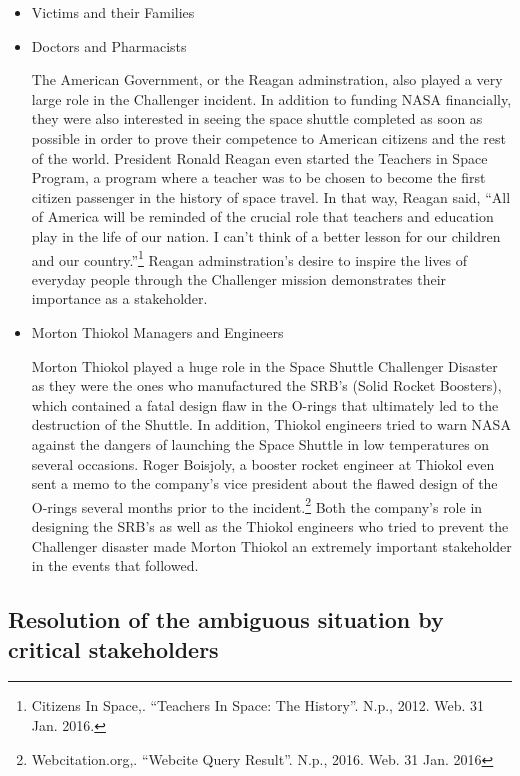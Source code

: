 \documentclass{article}
\newcommand{\q}[1]{``#1''}
\begin{document}
\begin{itemize}

\item
Victims and their Families

 \par

\item
Doctors and Pharmacists

The American Government, or the Reagan adminstration, also played a very large role in the Challenger incident. In addition to funding NASA financially, they were also interested in seeing the space shuttle completed as soon as possible in order to prove their competence to American citizens and the rest of the world. President Ronald Reagan even started the Teachers in Space Program, a program where a teacher was to be chosen to become the first citizen passenger in the history of space travel. In that way, Reagan said, \q{All of America will be reminded of the crucial role that teachers and education play in the life of our nation. I can't think of a better lesson for our children and our country.}\footnote{Citizens In Space,. \q{Teachers In Space: The History}. N.p., 2012. Web. 31 Jan. 2016.} Reagan adminstration's desire to inspire the lives of everyday people through the Challenger mission demonstrates their importance as a stakeholder.

\item
Morton Thiokol Managers and Engineers

Morton Thiokol played a huge role in the Space Shuttle Challenger Disaster as they were the ones who manufactured the SRB's (Solid Rocket Boosters), which contained a fatal design flaw in the O-rings that ultimately led to the destruction of the Shuttle. In addition, Thiokol engineers tried to warn NASA against the dangers of launching the Space Shuttle in low temperatures on several occasions. Roger Boisjoly, a booster rocket engineer at Thiokol even sent a memo to the company's vice president about the flawed design of the O-rings several months prior to the incident.\footnote{Webcitation.org,. \q{Webcite Query Result}. N.p., 2016. Web. 31 Jan. 2016} Both the company's role in designing the SRB's as well as the Thiokol engineers who tried to prevent the Challenger disaster made Morton Thiokol an extremely important stakeholder in the events that followed.
\end{itemize}

\vspace{10pt}
\subsection{Resolution of the ambiguous situation by critical stakeholders}
\end{document}
